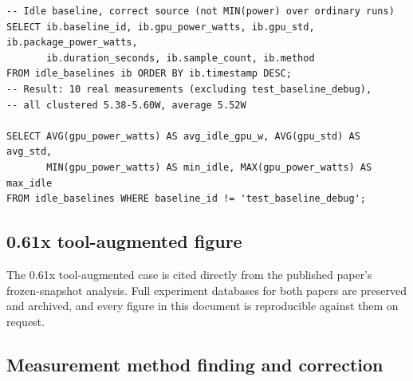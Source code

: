 \documentclass[10pt]{article}
\begin{document}
\begin{lstlisting}
-- Idle baseline, correct source (not MIN(power) over ordinary runs)
SELECT ib.baseline_id, ib.gpu_power_watts, ib.gpu_std, ib.package_power_watts,
       ib.duration_seconds, ib.sample_count, ib.method
FROM idle_baselines ib ORDER BY ib.timestamp DESC;
-- Result: 10 real measurements (excluding test_baseline_debug),
-- all clustered 5.38-5.60W, average 5.52W

SELECT AVG(gpu_power_watts) AS avg_idle_gpu_w, AVG(gpu_std) AS avg_std,
       MIN(gpu_power_watts) AS min_idle, MAX(gpu_power_watts) AS max_idle
FROM idle_baselines WHERE baseline_id != 'test_baseline_debug';
\end{lstlisting}

\subsection{0.61x tool-augmented figure}
\label{app:ooi-investigation}

The 0.61x tool-augmented case is cited directly from the published paper's
frozen-snapshot analysis. Full experiment databases for both papers are
preserved and archived, and every figure in this document is reproducible
against them on request.

\subsection{Measurement method finding and correction}
\label{app:method-finding}
\end{document}
